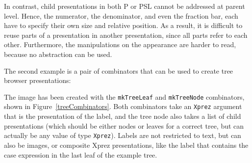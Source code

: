 In contrast, child presentations in both P or PSL cannot be addressed at parent level. Hence, the numerator, the denominator, and even the fraction bar, each have to specify their own size and relative position. As a result, it is difficult to reuse parts of a presentation in another presentation, since all parts refer to each other. Furthermore,  the manipulations on the appearance are harder to read, because no abstraction can be used. 


The second example is a pair of combinators that can be used to create tree browser presentations:

\begin{center}
\end{center}

\toHere

The image has been created with the \texttt{mkTreeLeaf} and \texttt{mkTreeNode} combinators, shown in Figure~\ref{treeCombinators}. Both combinators take an \texttt{Xprez} argument that is the presentation of the label, and the tree node also takes a list of child presentations (which should be either nodes or leaves for a correct tree, but can actually be any value of type \texttt{Xprez}). Labels are not restricted to text, but can also be images, or composite {\sc Xprez} presentations, like the label that contains the case expression in the last leaf of the example tree. 

